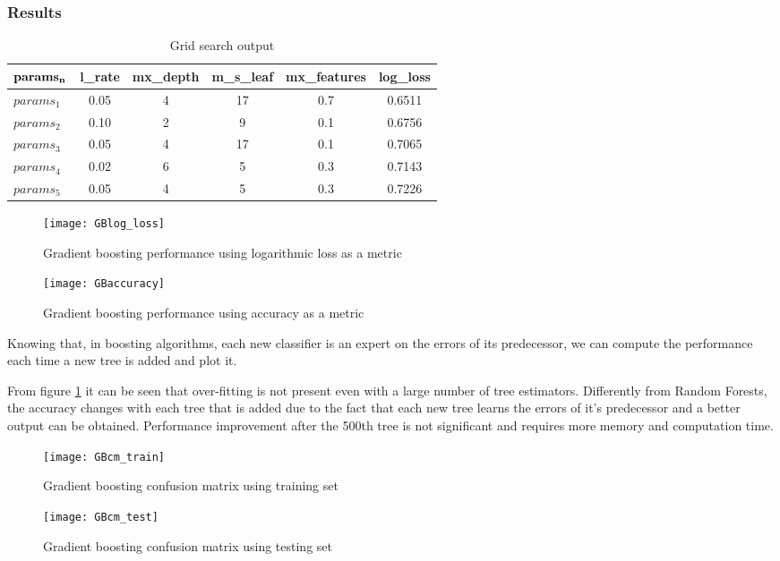 \subsubsection{Results}
\begin{table}[h!]
	\caption{Grid search output}
	\centering
	\begin{tabular}{ | l | c | c | c | c | c |}
		\hline
		$\bf{params_n}$ & \bf{l\_rate} &  \bf{mx\_depth} & \bf{m\_s\_leaf} & \bf{mx\_features} & \bf{log\_loss} \\ \hline
		$params_1$ & 0.05 & 4 & 17 & 0.7 & 0.6511 \\ \hline
		$params_2$ & 0.10 & 2 & 9 & 0.1 & 0.6756 \\ \hline
		$params_3$ & 0.05 & 4 & 17 & 0.1 & 0.7065 \\ \hline
		$params_4$ & 0.02 & 6 & 5 & 0.3 & 0.7143 \\ \hline
		$params_5$ & 0.05 & 4 & 5 & 0.3 & 0.7226 \\ \hline
	\end{tabular}
\end{table}
\begin{figure}[h!]
    \centering
    \texttt{[image: GBlog\_loss]}
    \caption{Gradient boosting performance using logarithmic loss as a metric}
    \label{fig:GBlog_loss}
\end{figure}
\begin{figure}[h!]
    \centering
    \texttt{[image: GBaccuracy]}
    \caption{Gradient boosting performance using accuracy as a metric}
    \label{fig:GBaccuracy}
\end{figure}
Knowing that, in boosting algorithms, each new classifier is an expert on the errors of its predecessor, we can compute the performance each time a new tree is added and plot it.

From figure \ref{fig:GBlog_loss} it can be seen that over-fitting is not present even with a large number of tree estimators. Differently from Random Forests, the accuracy changes with each tree that is added due to the fact that each new tree learns the errors of it's predecessor and a better output can be obtained. Performance improvement after the 500th tree is not significant and requires more memory and computation time.

\begin{figure}[h!]
    \centering
    \texttt{[image: GBcm\_train]}
    \caption{Gradient boosting confusion matrix using training set}
    \label{fig:GBcm_train}
\end{figure}
\begin{figure}[h!]
    \centering
    \texttt{[image: GBcm\_test]}
    \caption{Gradient boosting confusion matrix using testing set}
    \label{fig:GBcm_test}
\end{figure}



